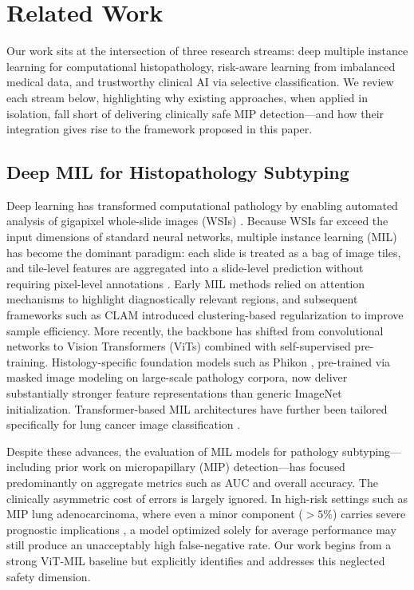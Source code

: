 \section{Related Work}\label{S6-3}

Our work sits at the intersection of three research streams: deep multiple instance learning for computational histopathology, risk-aware learning from imbalanced medical data, and trustworthy clinical AI via selective classification. We review each stream below, highlighting why existing approaches, when applied in isolation, fall short of delivering clinically safe MIP detection---and how their integration gives rise to the framework proposed in this paper.

\subsection{Deep MIL for Histopathology Subtyping}

Deep learning has transformed computational pathology by enabling automated analysis of gigapixel whole-slide images (WSIs) \cite{coudray2018classification, campanella2019clinical}. Because WSIs far exceed the input dimensions of standard neural networks, multiple instance learning (MIL) has become the dominant paradigm: each slide is treated as a bag of image tiles, and tile-level features are aggregated into a slide-level prediction without requiring pixel-level annotations \cite{ilse2018attention}. Early MIL methods relied on attention mechanisms to highlight diagnostically relevant regions, and subsequent frameworks such as CLAM \cite{lu2021data} introduced clustering-based regularization to improve sample efficiency. More recently, the backbone has shifted from convolutional networks to Vision Transformers (ViTs) \cite{dosovitskiy2020image} combined with self-supervised pre-training. Histology-specific foundation models such as Phikon \cite{filiot2023scaling}, pre-trained via masked image modeling on large-scale pathology corpora, now deliver substantially stronger feature representations than generic ImageNet initialization. Transformer-based MIL architectures have further been tailored specifically for lung cancer image classification \cite{an2024transformer}.

Despite these advances, the evaluation of MIL models for pathology subtyping---including prior work on micropapillary (MIP) detection---has focused predominantly on aggregate metrics such as AUC and overall accuracy. The clinically asymmetric cost of errors is largely ignored. In high-risk settings such as MIP lung adenocarcinoma, where even a minor component ($>5\%$) carries severe prognostic implications \cite{caso2020underlying, dai2017tumor}, a model optimized solely for average performance may still produce an unacceptably high false-negative rate. Our work begins from a strong ViT-MIL baseline but explicitly identifies and addresses this neglected safety dimension.

